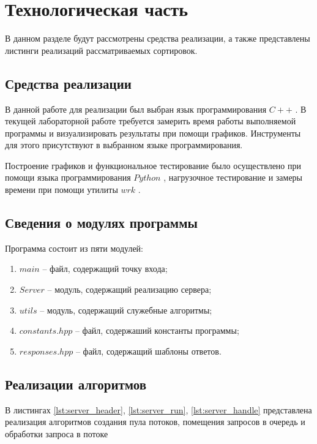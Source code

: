 \chapter{Технологическая часть}

В данном разделе будут рассмотрены средства реализации, а также представлены листинги реализаций рассматриваемых сортировок.

\section{Средства реализации}
В данной работе для реализации был выбран язык программирования $C++$ \cite{cpp-lang}. В текущей лабораторной работе требуется замерить время работы выполняемой программы
и визуализировать результаты при помощи графиков. Инструменты для этого присутствуют в выбранном языке программирования.

Построение графиков и функциональное тестирование было осуществлено при помощи языка программирования $Python$ \cite{python-lang}, нагрузочное тестирование и замеры времени при помощи утилиты $wrk$ \cite{wrk}.

\section{Сведения о модулях программы}
Программа состоит из пяти модулей:
\begin{enumerate}[label=\arabic*)]
	\item $main$ -- файл, содержащий точку входа;
	\item $Server$ -- модуль, содержащий реализацию сервера;
	\item $utils$ -- модуль, содержащий служебные алгоритмы;
	\item $constants.hpp$ -- файл, содержаший константы программы;
	\item $responses.hpp$ -- файл, содержащий шаблоны ответов. \newline
\end{enumerate}


\section{Реализации алгоритмов}

В листингах \ref{lst:server_header}, \ref{lst:server_run}, \ref{lst:server_handle} представлена реализация алгоритмов создания пула потоков, помещения запросов в очередь и обработки запроса в потоке\clearpage

